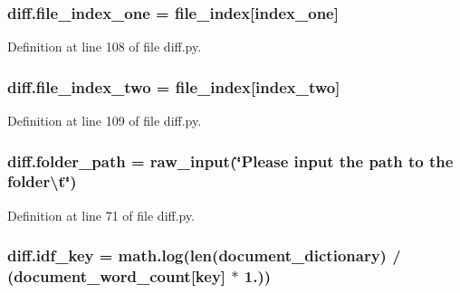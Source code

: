 \subsubsection[{\texorpdfstring{file\+\_\+index\+\_\+one}{file_index_one}}]{\setlength{\rightskip}{0pt plus 5cm}diff.\+file\+\_\+index\+\_\+one = {\bf file\+\_\+index}\mbox{[}index\+\_\+one\mbox{]}}\hypertarget{namespacediff_ac8ee8a35e457d5004c0f85b0383faf26}{}\label{namespacediff_ac8ee8a35e457d5004c0f85b0383faf26}


Definition at line 108 of file diff.\+py.

\subsubsection[{\texorpdfstring{file\+\_\+index\+\_\+two}{file_index_two}}]{\setlength{\rightskip}{0pt plus 5cm}diff.\+file\+\_\+index\+\_\+two = {\bf file\+\_\+index}\mbox{[}index\+\_\+two\mbox{]}}\hypertarget{namespacediff_a6f1ee631f8bf5af8ef567c3e029b0e6b}{}\label{namespacediff_a6f1ee631f8bf5af8ef567c3e029b0e6b}


Definition at line 109 of file diff.\+py.

\subsubsection[{\texorpdfstring{folder\+\_\+path}{folder_path}}]{\setlength{\rightskip}{0pt plus 5cm}diff.\+folder\+\_\+path = raw\+\_\+input(\char`\"{}Please input the path to the folder\textbackslash{}t\char`\"{})}\hypertarget{namespacediff_adccd64c100d50ed0e87d46c33e8636eb}{}\label{namespacediff_adccd64c100d50ed0e87d46c33e8636eb}


Definition at line 71 of file diff.\+py.

\subsubsection[{\texorpdfstring{idf\+\_\+key}{idf_key}}]{\setlength{\rightskip}{0pt plus 5cm}diff.\+idf\+\_\+key = math.\+log(len({\bf document\+\_\+dictionary}) / ({\bf document\+\_\+word\+\_\+count}\mbox{[}key\mbox{]} $\ast$ 1.))}\hypertarget{namespacediff_a1798972d3d6361a79c16d8470bf3471d}{}\label{namespacediff_a1798972d3d6361a79c16d8470bf3471d}


